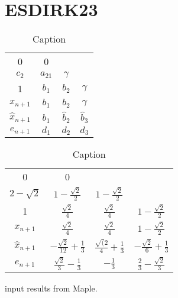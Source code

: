 \section{ESDIRK23}

\begin{table}[]
    \centering
\begin{tabular}{c|ccc}
0 & 0 & & \\
$c_{2}$ & $a_{21}$ & $\gamma$ & \\
1 & $b_{1}$ & $b_{2}$ & $\gamma$ \\
\hline$x_{n+1}$ & $b_{1}$ & $b_{2}$ & $\gamma$ \\
$\hat{x}_{n+1}$ & $\hat{b}_{1}$ & $\hat{b}_{2}$ & $\hat{b}_{3}$ \\
\hline$e_{n+1}$ & $d_{1}$ & $d_{2}$ & $d_{3}$
\end{tabular}
    \caption{Caption}
    \label{tab:my_label}
\end{table}


\begin{table}[]
    \centering
\begin{tabular}{c|ccc}
0 & 0 & & \\
$2 - \sqrt{2}$ & $1 - \frac{\sqrt{2}}{2}$ & $1 - \frac{\sqrt{2}}{2}$ & \\
1 & $\frac{\sqrt{2}}{4}$ & $\frac{\sqrt{2}}{4}$ & $1 - \frac{\sqrt{2}}{2}$ \\
\hline$x_{n+1}$ & $\frac{\sqrt{2}}{4}$ & $\frac{\sqrt{2}}{4}$ & $1 - \frac{\sqrt{2}}{2}$ \\
$\hat{x}_{n+1}$ & $-\frac{\sqrt{2}}{12} + \frac{1}{3}$ & $\frac{\sqrt(2}{4}+\frac{1}{3}$ & $-\frac{\sqrt{2}}{6} + \frac{1}{3}$ \\
\hline$e_{n+1}$ & $\frac{\sqrt{2}}{3} - \frac{1}{3}$ & $-\frac{1}{3}$ & $\frac{2}{3} - \frac{\sqrt{2}}{3}$
\end{tabular}
    \caption{Caption}
    \label{tab:my_label}
\end{table}

input results from Maple.